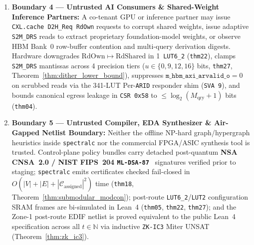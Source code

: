 \documentclass[10pt,twocolumn]{article}
\providecommand{\ScrubShimLuts}{341}
\providecommand{\ScrubShimPhysicalLUTs}{\ScrubShimLuts}
\theoremstyle{spectralthm}
\begin{document}
\begin{enumerate}
  \item \textbf{Boundary 4 --- Untrusted AI Consumers \& Shared-Weight Inference Partners:} A co-tenant GPU or inference partner may issue \texttt{CXL.cache D2H\_Req RdOwn} requests to corrupt shared weights, issue adaptive \texttt{S2M\_DRS} reads to extract proprietary foundation-model weights, or observe HBM Bank~0 row-buffer contention and multi-query derivation digests. Hardware downgrades $\mathrm{RdOwn} \mapsto \mathrm{RdShared}$ in 1~\mbox{\texttt{LUT6\_2}} (\texttt{thm22}), clamps \texttt{S2M\_DRS} mantissas across 4 precision tiers ($u \in \{0,9,12,16\}$ bits, \texttt{thm27}, Theorem~\ref{thm:dither_lower_bound}), suppresses $\texttt{m\_hbm\_axi\_arvalid\_o} = 0$ on scrubbed reads via the \ScrubShimPhysicalLUTs-LUT Per-\texttt{ARID} responder shim (\texttt{SVA 9}), and bounds canonical egress leakage in \texttt{CSR 0x58} to $\le \log_2(M_{\mathrm{qry}}+1)$ bits (\texttt{thm04}).
  \item \textbf{Boundary 5 --- Untrusted Compiler, EDA Synthesizer \& Air-Gapped Netlist Boundary:} Neither the offline NP-hard graph/hypergraph heuristics inside \texttt{spectralc} nor the commercial FPGA/ASIC synthesis tool is trusted. Control-plane policy bundles carry detached post-quantum \textbf{NSA CNSA~2.0 / NIST FIPS~204 \texttt{ML-DSA-87}}~\cite{fips204mldsa} signatures verified prior to staging; \texttt{spectralc} emits certificates checked fail-closed in $O(|V| + |E| + |\mathcal{C}_{\mathrm{assigned}}|^2)$ time (\texttt{thm18}, Theorem~\ref{thm:submodular_modcon}); post-route \mbox{\texttt{LUT6\_2}}/\texttt{LUT2} configuration SRAM frames are bi-simulated in Lean~4 (\texttt{thm05}, \texttt{thm22}, \texttt{thm27}); and the Zone-1 post-route EDIF netlist is proved equivalent to the public Lean~4 specification across all $t \in \mathbb{N}$ via inductive \texttt{ZK-IC3} Miter UNSAT (Theorem~\ref{thm:zk_ic3}).
\end{enumerate}
\end{document}
